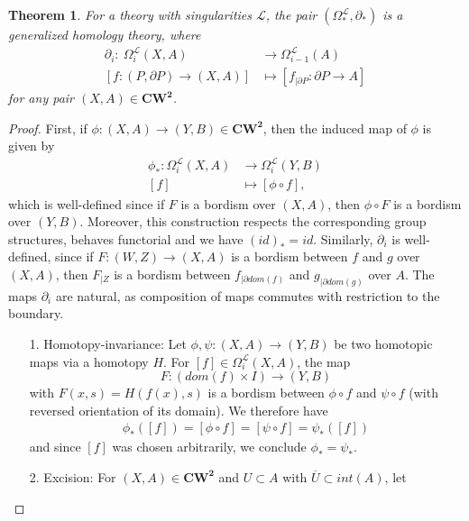 \documentclass{scrreprt}
\newtheorem{theorem}[prop]{Theorem}
\begin{document}
\begin{theorem}\label{Omegageneralizedhomology}
For a theory with singularities $\mathcal{L}$, the pair $(\Omega_*^{\mathcal{L}}, \partial_*)$ is a generalized homology theory, where 
\begin{align*}
\partial_i :\  \Omega_i^{\mathcal{L}}(X,A) &\to \Omega_{i-1}^{\mathcal{L}}(A) \\
[f: (P, \partial P) \to (X,A)] &\mapsto [f_{| \partial P}: \partial P \to A]
\end{align*}
for any pair $(X,A) \in \boldsymbol{CW^2}$.
\end{theorem}

\begin{proof}
First, if $\phi : (X,A) \to (Y,B) \in \boldsymbol{CW^2}$, then the induced map of $\phi $ is given by
\begin{align*}
\phi_* : \Omega_i^{\mathcal{L}}(X,A) &\to \Omega_i^{\mathcal{L}}(Y,B) \\
[f] &\mapsto [\phi \circ f],
\end{align*}
which is well-defined since if $F$ is a bordism over $(X,A)$, then $\phi \circ F$ is a bordism over $(Y,B)$. Moreover, this construction respects the corresponding group structures, behaves functorial and we have $(id)_*=id$. Similarly, $\partial_i$ is well-defined, since if $F:(W,Z) \to (X,A)$ is a bordism between $f$ and $g$ over $(X,A)$, then $F_{|Z}$ is a bordism between $f_{| \partial dom(f)}$ and $g_{| \partial dom(g)}$ over $A$. The maps $\partial_i$ are natural, as composition of maps commutes with restriction to the boundary. 
\begin{itemize}
\item[1.] Homotopy-invariance: Let $\phi, \psi : (X,A) \to (Y,B)$ be two homotopic maps via a homotopy $H$. For $[f] \in \Omega_i^{\mathcal{L}}(X,A)$, the map
\begin{equation*}
F: (dom(f) \times I) \to (Y,B) 
\end{equation*}
with $F(x,s)=H(f(x),s)$ is a bordism between $\phi \circ f$ and $\psi \circ f$ (with reversed orientation of its domain). We therefore have
\begin{align*}
\phi_* ([f]) = [\phi \circ f] = [\psi \circ f] = \psi_* ([f])
\end{align*}
and since $[f]$ was chosen arbitrarily, we conclude $\phi_*= \psi_*$.
\item[2.] Excision: For $(X,A) \in \boldsymbol{CW^2}$ and $U \subset A$ with $\overline{U} \subset int(A)$, let 
\begin{equation*}

\end{equation*}
\end{itemize}
\end{proof}
\end{document}
